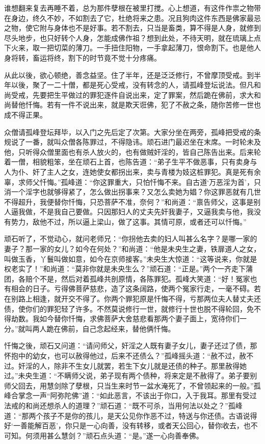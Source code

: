 \documentclass[a4paper,12pt,UTF8,twoside]{ctexbook}
\begin{document}
谁想翻来复去再睡不着，总为那件孽根在被里打搅。心上想道，有这件作祟之物带在身边，终久不妙，不如割去了它，杜绝将来之患。况且狗肉这件东西是佛家最忌之物，使它附与身体也不是好事。若不割去，只当是畜类，算不得是人身，就修到尽头地步，也只好转个人身，怎能成佛作祖？想到此处，不待天明，就在琉璃上点下火来，取一把切菜的薄刀。一手扭住阳物，一手拿起薄刀，恨命割下。也是他人身将转，畜运将终，割下的时节竟不觉十分疼痛。

从此以後，欲心顿绝，善念益坚。住了半年，还是泛泛修行，不曾摩顶受戒。到半年以後，聚了一二十僧，都是死心受戒，没有转念的人，请孤峰登坛说法。但凡和尚受戒，先要把生平做过的罪犯逐件自说出来，定了罪案，然后跪在佛前，求大和尚替他忏悔。若有一件不说出来，就是欺天诳佛，犯了不赦之条，随你苦修一世也成不得正果。

众僧请孤峰登坛拜毕，以入门之先后定了次第。大家分坐在两旁，孤峰把受戒的条规说了一番，就叫众僧各陈罪过，不得隐讳。顽石进门最迟坐在末席。一时轮未及他，只听得众僧里面也有杀人放火的，也有做贼奸淫的，皆自己陈告出来。后来轮着一僧，相貌粗笨，坐在顽石上首，也陈告道：“弟子生平不做恶事，只有卖身与人为仆、奸了主人之女，连她使女都拐出来，卖与青楼为妓这桩罪犯。真是死有余辜，求师父忏悔。”孤峰道：“你这罪重大，只怕忏悔不来。自古道‘万恶淫为首’，只消一个淫字也就够得紧了，怎么做出拐事来？又怎么卖她为娼？你这罪恶就有几世不得超升，我便替你忏悔，只恐菩萨不准，奈何？”和尚道：“禀告师父，这事是别人逼我做，不是我自己要做。只因那妇人的丈夫先奸我妻子，又逼我卖与他，我没有势力，敌他不过，所以逼上梁山，做了这事。其情可原，或者还可以忏悔。”

顽石听了，不觉动心，就问老师兄：“你拐他去卖的妇人叫甚么名字？是哪一家的妻子？那一家的女儿？如今在何处？”和尚道：“他是未央生之妻，铁扉道人之女，叫做玉香，丫鬟叫做如意，如今在京师接客。”未央生大惊道：“这等说来，你就是权老实了！”和尚道：“莫非你就是未央生么？”顽石道：“正是。”两个一齐走下蒲团，各赔个不是，然后对着孤峰共剖原情，各陈罪犯。孤峰大笑道：“好！冤家也有相会的日子。亏得佛菩萨慈悲，造了这条阔路，使两个冤家行走，一毫不碍。若在别路上相逢，就开交不得了。你两个罪犯原是忏悔不得，亏那两位夫人替丈夫还债，使你们的罪犯轻了许多。不然莫说修行一世，就修行十世也脱不得轮回，免不得劫数。我如今替你忏悔，求佛菩萨大舍慈悲看那两个妻子面上，宽待你们一分。”就叫两人跪在佛前，自己念起经来，替他俩忏悔。

忏悔之後，顽石又问道：“请问师父，奸淫之人既有妻子女儿，妻子还过了债，那怀抱中的幼女，也可以赦得他过，后来不还债么？”孤峰摇头道：“赦不过，赦不过。奸淫的人，除非不生女儿就罢，若生下女儿就是还债的种子。那里赦得她过。”未央生道：“不瞒师父说，弟子现有两个债种，将来定是不赦得了。弟子要别师父回去，用慧剑除了孽根，只当生来时节一盆水淹死了，不曾领起来的一般。”孤峰合掌念一声“阿弥陀佛”道：“如此恶言，不该出于你口，入于我耳。那里有受过法戒的和尚还想杀人的道理？”顽石道：“既不可杀，当用何法以处之？”孤峰道：“那两个孩子不是你的孩儿，是天公见你作恶不过，特送与你还债。古语说得好‘一善能解百恶’，你只是一心向善，没有转移，或者天公回心，替你收去，也不可知。何须用甚么慧剑？”顽石点头道：“是。”遂一心向善奉佛。
\end{document}
